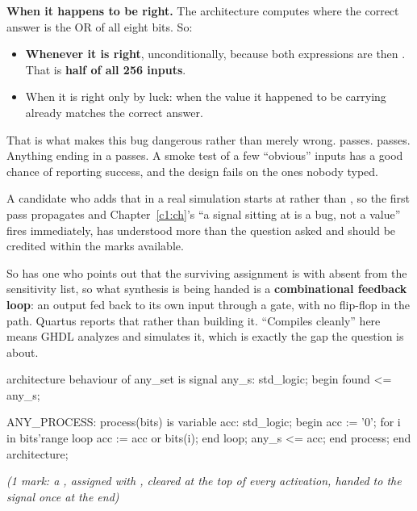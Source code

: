 \textbf{When it happens to be right.} The architecture computes  where
the correct answer is the OR of all eight bits. So:
\begin{itemize}
  \item \textbf{Whenever  it is right}, unconditionally, because both
    expressions are then . That is \textbf{half of all 256 inputs}.
  \item When  it is right only by luck: when the value it happened to be
    carrying already matches the correct answer.
\end{itemize}
That is what makes this bug dangerous rather than merely wrong.  passes.
 passes. Anything ending in a  passes. A smoke test of a few ``obvious''
inputs has a good chance of reporting success, and the design fails on the ones nobody typed.

A candidate who adds that in a real simulation  starts at  rather than
, so the first pass propagates  and Chapter~\ref{c1:ch}'s ``a signal sitting at
 is a bug, not a value'' fires immediately, has understood more than the question asked
and should be credited within the marks available.

So has one who points out that the surviving assignment is  with
 absent from the sensitivity list, so what synthesis is being handed is a
\textbf{combinational feedback loop}: an output fed back to its own input through a gate, with no
flip-flop in the path. Quartus reports that rather than building it. ``Compiles cleanly'' here means
GHDL analyzes and simulates it, which is exactly the gap the question is about.

\begin{vhdlcode}
architecture behaviour of any_set is
signal any_s: std_logic;
begin
    found <= any_s;

    ANY_PROCESS: process(bits) is
        variable acc: std_logic;
    begin
        acc := '0';
        for i in bits'range loop
            acc := acc or bits(i);
        end loop;
        any_s <= acc;
    end process;
end architecture;
\end{vhdlcode}

\noindent\textit{(1 mark: a , assigned with \code{:=}, cleared at the top of every
activation, handed to the signal once at the end)}

